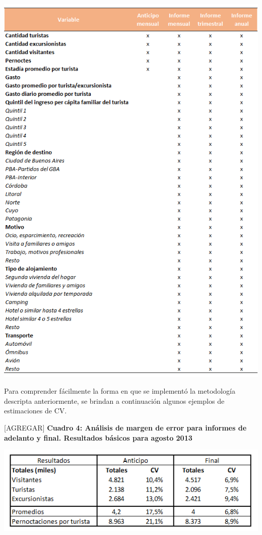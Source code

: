 \documentclass[
  openany]{book}
\begin{document}
\includegraphics{cuadros_graficos/04_coeficiente_de_variacion.png}

Para comprender fácilmente la forma en que se implementó la metodología descripta anteriormente, se brindan a continuación algunos ejemplos de estimaciones de CV.

{[}AGREGAR{]} \textbf{Cuadro 4: Análisis de margen de error para informes de adelanto y final. Resultados básicos para agosto 2013}

\includegraphics{cuadros_graficos/05_analisis_margen_de_error.png}
\end{document}
